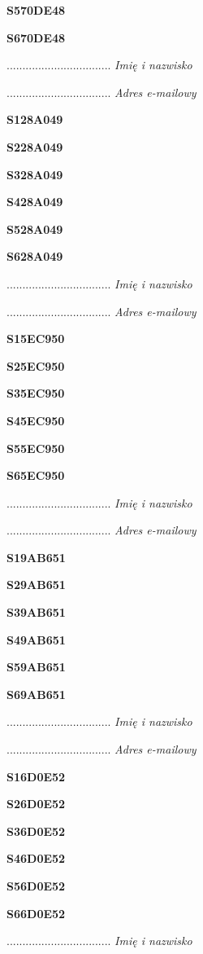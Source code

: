 \Large \textbf{S570DE48}

\Large \textbf{S670DE48}

.................................
\textit{Imię i nazwisko}

.................................
\textit{Adres e-mailowy}

\Large \textbf{S128A049}

\Large \textbf{S228A049}

\Large \textbf{S328A049}

\Large \textbf{S428A049}

\Large \textbf{S528A049}

\Large \textbf{S628A049}

.................................
\textit{Imię i nazwisko}

.................................
\textit{Adres e-mailowy}

\Large \textbf{S15EC950}

\Large \textbf{S25EC950}

\Large \textbf{S35EC950}

\Large \textbf{S45EC950}

\Large \textbf{S55EC950}

\Large \textbf{S65EC950}

.................................
\textit{Imię i nazwisko}

.................................
\textit{Adres e-mailowy}

\Large \textbf{S19AB651}

\Large \textbf{S29AB651}

\Large \textbf{S39AB651}

\Large \textbf{S49AB651}

\Large \textbf{S59AB651}

\Large \textbf{S69AB651}

.................................
\textit{Imię i nazwisko}

.................................
\textit{Adres e-mailowy}

\Large \textbf{S16D0E52}

\Large \textbf{S26D0E52}

\Large \textbf{S36D0E52}

\Large \textbf{S46D0E52}

\Large \textbf{S56D0E52}

\Large \textbf{S66D0E52}

.................................
\textit{Imię i nazwisko}

